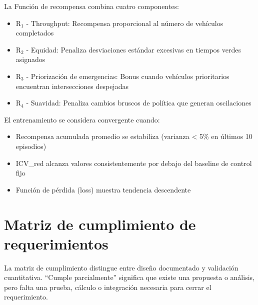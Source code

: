 \documentclass[12pt,a4paper,oneside]{report}
\begin{document}
La Función de recompensa combina cuatro componentes:

\begin{itemize}
\item
  R\ensuremath{_{1}} - Throughput: Recompensa proporcional al número de vehículos completados
\item
  R\ensuremath{_{2}} - Equidad: Penaliza desviaciones estándar excesivas en tiempos verdes asignados
\item
  R\ensuremath{_{3}} - Priorización de emergencias: Bonus cuando vehículos prioritarios encuentran intersecciones despejadas
\item
  R\ensuremath{_{4}} - Suavidad: Penaliza cambios bruscos de política que generan oscilaciones
\end{itemize}

El entrenamiento se considera convergente cuando:

\begin{itemize}
\item
  Recompensa acumulada promedio se estabiliza (varianza \textless{} 5\% en últimos 10 episodios)
\item
  ICV\_red alcanza valores consistentemente por debajo del baseline de control fijo
\item
  Función de pérdida (loss) muestra tendencia descendente
\end{itemize}

\section{Matriz de cumplimiento de requerimientos}\label{cumplimiento-requerimientos-v2}

La matriz de cumplimiento distingue entre diseño documentado y validación cuantitativa. ``Cumple parcialmente'' significa que existe una propuesta o análisis, pero falta una prueba, cálculo o integración necesaria para cerrar el requerimiento.
\end{document}
